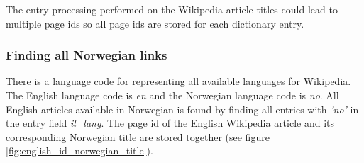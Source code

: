 



The entry processing performed on the Wikipedia article titles could lead to multiple page ids so all page ids are stored for each dictionary entry. %




\subsubsection{Finding all Norwegian links}
There is a language code for representing all available languages for Wikipedia. The English language code is \emph{en} and the Norwegian language code is \emph{no}. All English articles available in Norwegian is found by finding all entries with \emph{'no'} in the entry field \emph{il\_lang}. The page id of the English Wikipedia article and its corresponding Norwegian title are stored together (see figure \ref{fig:english_id_norwegian_title}).  

